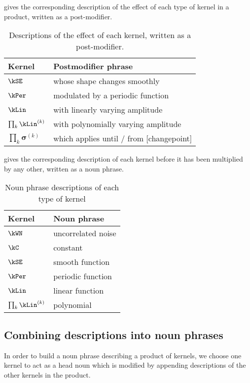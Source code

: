  gives the corresponding description of the effect of each type of kernel in a product, written as a post-modifier.
%
\begin{table}[h!]
\centering
\begin{tabular}{l|l}
Kernel & Postmodifier phrase \\
\midrule
$\kSE$  & whose shape changes smoothly \\
$\kPer$ & modulated by a periodic function \\
$\kLin$ & with linearly varying amplitude \\
$\prod_k \kLin^{(k)}$ & with polynomially varying amplitude \\
$\prod_k \boldsymbol{\sigma}^{(k)}$ & which applies until / from [changepoint] \\
\end{tabular}
\caption[Descriptions of the effect of each kernel, written as a post-modifier]{
Descriptions of the effect of each kernel, written as a post-modifier.
}
\label{table:modifiers}
\end{table}

 gives the corresponding description of each kernel before it has been multiplied by any other, written as a noun phrase.
%
\begin{table}[h!]
\centering
\begin{tabular}{l|l}
Kernel & Noun phrase \\
\midrule
$\kWN$  & uncorrelated noise \\
$\kC$   & constant \\
$\kSE$  & smooth function \\
$\kPer$ & periodic function \\
$\kLin$ & linear function \\
$\prod_k \kLin^{(k)}$ & polynomial \\
\end{tabular}
\caption[Noun phrase descriptions of each type of kernel]{
Noun phrase descriptions of each type of kernel
}
\label{table:nouns}
\end{table}



\subsection{Combining descriptions into noun phrases}

In order to build a noun phrase describing a product of kernels, we choose one kernel to act as a head noun which is modified by appending descriptions of the other kernels in the product.

